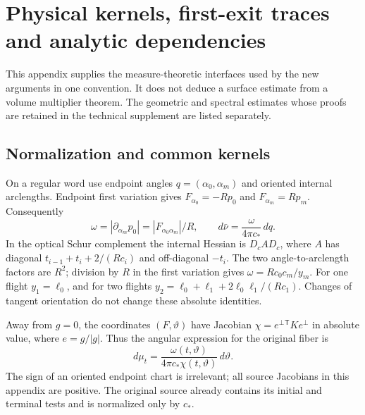 \section{Physical kernels, first-exit traces and analytic dependencies}
\label{app:v83-kernels}
This appendix supplies the measure-theoretic interfaces used by the new
arguments in one convention. It does not deduce a surface estimate from a
volume multiplier theorem. The geometric and spectral estimates whose
proofs are retained in the technical supplement are listed separately.

\subsection{Normalization and common kernels}
On a regular word use endpoint angles $q=(\alpha_0,\alpha_m)$ and
oriented internal arclengths. Endpoint first variation gives
$F_{\alpha_0}=-Rp_0$ and $F_{\alpha_m}=Rp_m$. Consequently
\[
 \omega=|\partial_{\alpha_m}p_0|=|F_{\alpha_0\alpha_m}|/R,
 \qquad d\bar\nu=\frac{\omega}{4\pi c_*}\,dq.
\]
In the optical Schur complement the internal Hessian is $D_cAD_c$,
where $A$ has diagonal $t_{i-1}+t_i+2/(Rc_i)$ and off-diagonal
$-t_i$. The two angle-to-arclength factors are $R^2$; division by
$R$ in the first variation gives $\omega=Rc_0c_m/y_m$. For one
flight $y_1=\ell_0$, and for two flights
$y_2=\ell_0+\ell_1+2\ell_0\ell_1/(Rc_1)$. Changes of tangent
orientation do not change these absolute identities.

Away from $g=0$, the coordinates $(F,\vartheta)$ have Jacobian
$\chi=e^\perp{}^{\mathsf T}Ke^\perp$ in absolute value, where
$e=g/|g|$. Thus the angular expression for the original fiber is
\begin{equation}\label{eq:v83-appendix-fiber}
 d\mu_t=\frac{\omega(t,\vartheta)}{4\pi c_*\chi(t,\vartheta)}
          \,d\vartheta.
\end{equation}
The sign of an oriented endpoint chart is irrelevant; all source
Jacobians in this appendix are positive. The original source already
contains its initial and terminal tests and is normalized only by $c_*$. 

